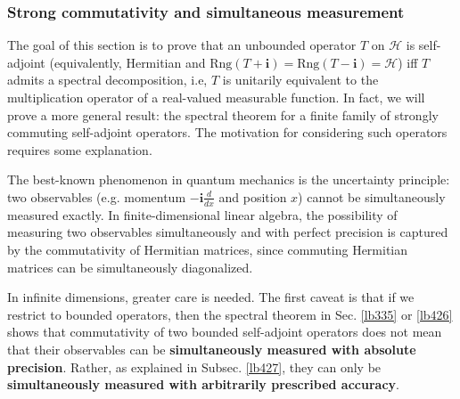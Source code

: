 \documentclass[12pt,b5paper,notitlepage]{article}
\theoremstyle{definition}
\theoremstyle{plain}
\newcommand{\im}{\mathbf{i}}
\newcommand{\Rng}{\mathrm{Rng}}
\newcommand{\MH}{\mathcal H}
\numberwithin{equation}{section}
\begin{document}
\subsubsection{Strong commutativity and simultaneous measurement}\label{lb428}


The goal of this section is to prove that an unbounded operator $T$ on $\MH$ is self-adjoint (equivalently, Hermitian and $\Rng(T+\im)=\Rng(T-\im)=\MH$) iff $T$ admits a spectral decomposition, i.e, $T$ is unitarily equivalent to the multiplication operator of a real-valued measurable function. In fact, we will prove a more general result: the spectral theorem for a finite family of strongly commuting self-adjoint operators. The motivation for considering such operators requires some explanation.


The best-known phenomenon in quantum mechanics is the uncertainty principle: two observables (e.g. momentum $-\im\frac d{dx}$ and position $x$) cannot be simultaneously measured exactly. In finite-dimensional linear algebra, the possibility of measuring two observables simultaneously and with perfect precision is captured by the commutativity of Hermitian matrices, since commuting Hermitian matrices can be simultaneously diagonalized.


In infinite dimensions, greater care is needed. The first caveat is that if we restrict to bounded operators, then the spectral theorem in Sec. \ref{lb335} or \ref{lb426} shows that commutativity of two bounded self-adjoint operators does not mean that their observables can be \textbf{simultaneously measured with absolute precision}. Rather, as explained in Subsec. \ref{lb427}, they can only be \textbf{simultaneously measured with arbitrarily prescribed accuracy}.
\end{document}
